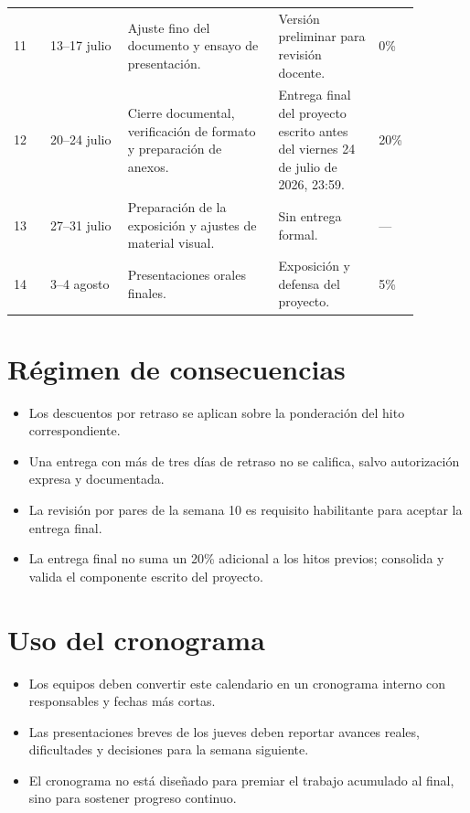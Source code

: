 \documentclass[11pt]{article}
\begin{document}
\begin{longtable}{p{0.08\linewidth} p{0.17\linewidth} p{0.33\linewidth} p{0.22\linewidth} p{0.08\linewidth}}
11 & 13--17 julio & Ajuste fino del documento y ensayo de presentaci\'on. & Versi\'on preliminar para revisi\'on docente. & 0\% \\
12 & 20--24 julio & Cierre documental, verificaci\'on de formato y preparaci\'on de anexos. & Entrega final del proyecto escrito antes del viernes 24 de julio de 2026, 23:59. & 20\% \\
13 & 27--31 julio & Preparaci\'on de la exposici\'on y ajustes de material visual. & Sin entrega formal. & --- \\
14 & 3--4 agosto & Presentaciones orales finales. & Exposici\'on y defensa del proyecto. & 5\% \\
\bottomrule
\end{longtable}
\normalsize

\section{R\'egimen de consecuencias}
\begin{itemize}
\item Los descuentos por retraso se aplican sobre la ponderaci\'on del hito correspondiente.
\item Una entrega con m\'as de tres d\'ias de retraso no se califica, salvo autorizaci\'on expresa y documentada.
\item La revisi\'on por pares de la semana 10 es requisito habilitante para aceptar la entrega final.
\item La entrega final no suma un 20\% adicional a los hitos previos; consolida y valida el componente escrito del proyecto.
\end{itemize}

\section{Uso del cronograma}
\begin{itemize}
\item Los equipos deben convertir este calendario en un cronograma interno con responsables y fechas m\'as cortas.
\item Las presentaciones breves de los jueves deben reportar avances reales, dificultades y decisiones para la semana siguiente.
\item El cronograma no est\'a dise\~nado para premiar el trabajo acumulado al final, sino para sostener progreso continuo.
\end{itemize}
\end{document}
